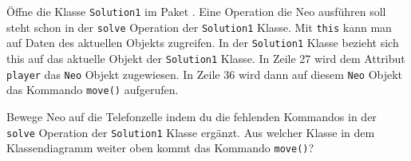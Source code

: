 





Öffne die Klasse \texttt{Solution1} im Paket \solutionPackage.
    Eine Operation die Neo ausführen soll steht schon in der \texttt{solve} Operation der \texttt{Solution1} Klasse.
    Mit \texttt{this} kann man auf Daten des aktuellen Objekts zugreifen.
    In der \texttt{Solution1} Klasse bezieht sich this auf das aktuelle Objekt der \texttt{Solution1} Klasse.
    In Zeile 27 wird dem Attribut \texttt{player} das \texttt{Neo} Objekt zugewiesen.
    In Zeile 36 wird dann auf diesem \texttt{Neo} Objekt das Kommando \texttt{move()} aufgerufen.


        \subexcercise Bewege Neo auf die Telefonzelle indem du die fehlenden Kommandos in der \texttt{solve} Operation der \texttt{Solution1} Klasse ergänzt.
        \subexcercise Aus welcher Klasse in dem Klassendiagramm weiter oben kommt das Kommando \texttt{move()}?

